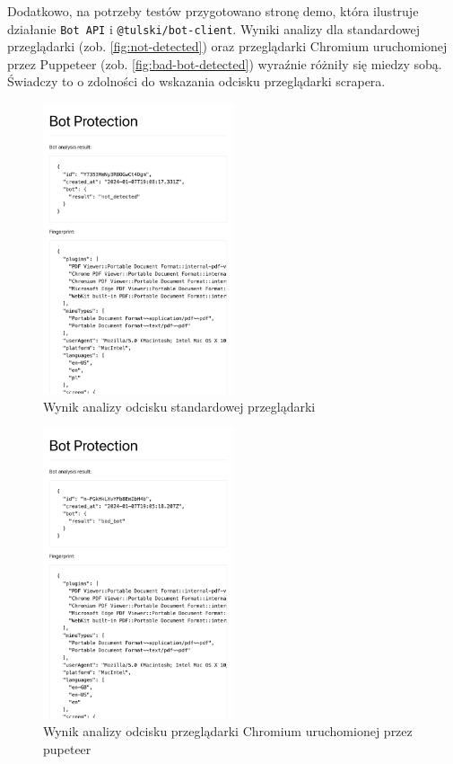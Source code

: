 Dodatkowo, na potrzeby testów przygotowano stronę demo, która ilustruje działanie \texttt{Bot API} i \texttt{@tulski/bot-client}.
Wyniki analizy dla standardowej przeglądarki (zob. \autoref{fig:not-detected})
oraz przeglądarki Chromium uruchomionej przez Puppeteer (zob. \autoref{fig:bad-bot-detected}) wyraźnie różniły się miedzy sobą.
Świadczy to o zdolności do wskazania odcisku przeglądarki scrapera.

\newpage
\begin{multicols}{2}
    \begin{figure}[H]
        \centering
        \includegraphics[width=0.5\textwidth]{img/bot-protection-not-detected}
        \caption{Wynik analizy odcisku standardowej przeglądarki}
        \label{fig:not-detected}
    \end{figure}
    \columnbreak
    \begin{figure}[H]
        \centering
        \includegraphics[width=0.5\textwidth]{img/bot-protection-bad-bot}
        \caption{Wynik analizy odcisku przeglądarki Chromium uruchomionej przez pupeteer}
        \label{fig:bad-bot-detected}
    \end{figure}
\end{multicols}

